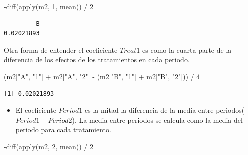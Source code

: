 \documentclass[
  12pt,
  a4paper,
  extrafontsizes,
  onecolumn,
  openright]{memoir}
\newenvironment{Shaded}{\begin{snugshade}}{\end{snugshade}}
\newcommand{\DecValTok}[1]{\textcolor[rgb]{0.68,0.00,0.00}{#1}}
\newcommand{\FunctionTok}[1]{\textcolor[rgb]{0.28,0.35,0.67}{#1}}
\newcommand{\NormalTok}[1]{\textcolor[rgb]{0.00,0.23,0.31}{#1}}
\newcommand{\SpecialCharTok}[1]{\textcolor[rgb]{0.37,0.37,0.37}{#1}}
\newcommand{\StringTok}[1]{\textcolor[rgb]{0.13,0.47,0.30}{#1}}
\providecommand{\tightlist}{%
  \setlength{\itemsep}{0pt}\setlength{\parskip}{0pt}}\usepackage{longtable,booktabs,array}
\begin{document}
\begin{Shaded}
\begin{Highlighting}[]
\SpecialCharTok{{-}}\FunctionTok{diff}\NormalTok{(}\FunctionTok{apply}\NormalTok{(m2, }\DecValTok{1}\NormalTok{, mean)) }\SpecialCharTok{/} \DecValTok{2}
\end{Highlighting}
\end{Shaded}

\begin{verbatim}
         B 
0.02021893 
\end{verbatim}

\normalsize

Otra forma de entender el coeficiente \(Treat1\) es como la cuarta parte
de la diferencia de los efectos de los tratamientos en cada periodo.

\scriptsize

\begin{Shaded}
\begin{Highlighting}[]
\NormalTok{(m2[}\StringTok{"A"}\NormalTok{, }\StringTok{"1"}\NormalTok{] }\SpecialCharTok{+}\NormalTok{ m2[}\StringTok{"A"}\NormalTok{, }\StringTok{"2"}\NormalTok{] }\SpecialCharTok{{-}}\NormalTok{ (m2[}\StringTok{"B"}\NormalTok{, }\StringTok{"1"}\NormalTok{] }\SpecialCharTok{+}\NormalTok{ m2[}\StringTok{"B"}\NormalTok{, }\StringTok{"2"}\NormalTok{])) }\SpecialCharTok{/} \DecValTok{4}
\end{Highlighting}
\end{Shaded}

\begin{verbatim}
[1] 0.02021893
\end{verbatim}

\normalsize

\begin{itemize}
\tightlist
\item
  El coeficiente \(Period1\) es la mitad la diferencia de la media entre
  periodos(\(Period1 - Period2\)). La media entre periodos se calcula
  como la media del periodo para cada tratamiento.
\end{itemize}

\scriptsize

\begin{Shaded}
\begin{Highlighting}[]
\SpecialCharTok{{-}}\FunctionTok{diff}\NormalTok{(}\FunctionTok{apply}\NormalTok{(m2, }\DecValTok{2}\NormalTok{, mean)) }\SpecialCharTok{/} \DecValTok{2}
\end{Highlighting}
\end{Shaded}
\end{document}
